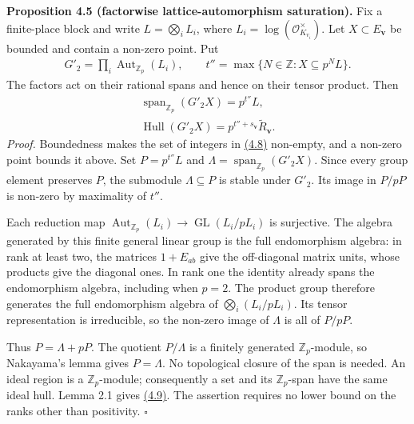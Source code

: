\documentclass[11pt,a4paper]{amsart}
\begin{document}
\par\smallskip\noindent\textbf{Proposition 4.5 (factorwise lattice-automorphism saturation).} Fix a finite-place block and write $L=\bigotimes_i L_i$, where $L_i=\log(\mathcal O_{K_{v_i}}^\times)$. Let $X\subset E_{\mathbf v}$ be bounded and contain a non-zero point. Put
\begin{equation}
\begin{gathered}
G'_2=\prod_i\operatorname{Aut}_{\mathbb Z_p}(L_i),\qquad
t''=\max\{N\in\mathbb Z:X\subseteq p^N L\}.
\end{gathered}
\tag{4.8}\label{eq:4.8}
\end{equation}
The factors act on their rational spans and hence on their tensor product. Then
\begin{equation}
\begin{gathered}
\operatorname{span}_{\mathbb Z_p}(G'_2X)=p^{t''}L,\\
\operatorname{Hull}(G'_2X)=p^{t''+s_{\mathbf v}}\widetilde R_{\mathbf v}.
\end{gathered}
\tag{4.9}\label{eq:4.9}
\end{equation}
\emph{Proof.} Boundedness makes the set of integers in \hyperref[eq:4.8]{(4.8)} non-empty, and a non-zero point bounds it above. Set $P=p^{t''}L$ and $\Lambda=\operatorname{span}_{\mathbb Z_p}(G'_2X)$. Since every group element preserves $P$, the submodule $\Lambda\subseteq P$ is stable under $G'_2$. Its image in $P/pP$ is non-zero by maximality of $t''$.


Each reduction map $\operatorname{Aut}_{\mathbb Z_p}(L_i)\longrightarrow\operatorname{GL}(L_i/pL_i)$ is surjective. The algebra generated by this finite general linear group is the full endomorphism algebra: in rank at least two, the matrices $1+E_{ab}$ give the off-diagonal matrix units, whose products give the diagonal ones. In rank one the identity already spans the endomorphism algebra, including when $p=2$. The product group therefore generates the full endomorphism algebra of $\bigotimes_i(L_i/pL_i)$. Its tensor representation is irreducible, so the non-zero image of $\Lambda$ is all of $P/pP$.


Thus $P=\Lambda+pP$. The quotient $P/\Lambda$ is a finitely generated $\mathbb Z_p$-module, so Nakayama's lemma gives $P=\Lambda$. No topological closure of the span is needed. An ideal region is a $\mathbb Z_p$-module; consequently a set and its $\mathbb Z_p$-span have the same ideal hull. Lemma 2.1 gives \hyperref[eq:4.9]{(4.9)}. The assertion requires no lower bound on the ranks other than positivity. \hfill$\square$
\end{document}
